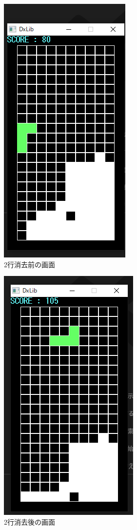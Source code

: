 \begin{figure}[htb]
  \begin{center}
    \includegraphics[scale=0.5]{./soft_img/twolinebefore.png}
    \caption{2行消去前の画面}
    \label{two1}
  \end{center}
\end{figure}
\begin{figure}[htb]
  \begin{center}
    \includegraphics[scale=0.5]{./soft_img/twolineafter.png}
    \caption{2行消去後の画面}
    \label{two2}
  \end{center}
\end{figure}

